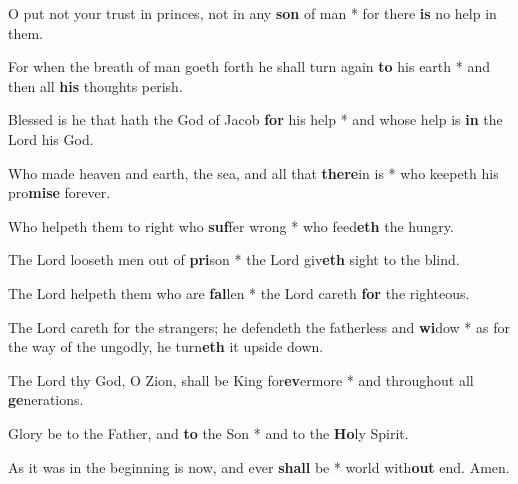 \begin{multicols}{2}
	O put not your trust in princes, not in any \textbf{son} of man * for there \textbf{is} no help in them.
	
	For when the breath of man goeth forth he shall turn again \textbf{to} his earth * and then all \textbf{his} thoughts perish.
	
	Blessed is he that hath the God of Jacob \textbf{for} his help * and whose help is \textbf{in} the Lord his God.
	
	Who made heaven and earth, the sea, and all that \textbf{there}in is * who keepeth his pro\textbf{mise} forever.
	
	Who helpeth them to right who \textbf{suf}fer wrong * who feed\textbf{eth} the hungry.
	
	The Lord looseth men out of \textbf{pri}son * the Lord giv\textbf{eth} sight to the blind.
	
	The Lord helpeth them who are \textbf{fal}len * the Lord careth \textbf{for} the righteous.
	
	The Lord careth for the strangers; he defendeth the fatherless and \textbf{wi}dow * as for the way of the ungodly, he turn\textbf{eth} it upside down.
	
	The Lord thy God, O Zion, shall be King for\textbf{ev}ermore * and throughout all \textbf{ge}nerations.
	
	Glory be to the Father, and \textbf{to} the Son * and to the \textbf{Ho}ly Spirit.
	
	As it was in the beginning is now, and ever \textbf{shall} be * world with\textbf{out} end. Amen.
\end{multicols}